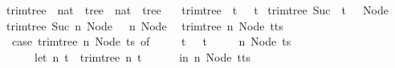 \begin{isabellebox}
    \isamarkupfalse%
\ trim{\isacharunderscore}{\kern0pt}tree\ {\isacharcolon}{\kern0pt}{\isacharcolon}{\kern0pt}\ {\isachardoublequoteopen}nat\ {\isasymRightarrow}\ tree\ {\isasymRightarrow}\ nat\ {\isasymtimes}\ tree{\isachardoublequoteclose}\ \isanewline
\ \ {\isachardoublequoteopen}trim{\isacharunderscore}{\kern0pt}tree\ {}\ t\ {\isacharequal}{\kern0pt}\ {\isacharparenleft}{\kern0pt}{}{\isacharcomma}{\kern0pt}\ t{\isacharparenright}{\kern0pt}{\isachardoublequoteclose}\isanewline
{\isacharbar}{\kern0pt}\ {\isachardoublequoteopen}trim{\isacharunderscore}{\kern0pt}tree\ {\isacharparenleft}{\kern0pt}Suc\ {}{\isacharparenright}{\kern0pt}\ t\ {\isacharequal}{\kern0pt}\ {\isacharparenleft}{\kern0pt}{}{\isacharcomma}{\kern0pt}\ Node\ {\isacharbrackleft}{\kern0pt}{\isacharbrackright}{\kern0pt}{\isacharparenright}{\kern0pt}{\isachardoublequoteclose}\isanewline
{\isacharbar}{\kern0pt}\ {\isachardoublequoteopen}trim{\isacharunderscore}{\kern0pt}tree\ {\isacharparenleft}{\kern0pt}Suc\ n{\isacharparenright}{\kern0pt}\ {\isacharparenleft}{\kern0pt}Node\ {\isacharbrackleft}{\kern0pt}{\isacharbrackright}{\kern0pt}{\isacharparenright}{\kern0pt}\ {\isacharequal}{\kern0pt}\ {\isacharparenleft}{\kern0pt}n{\isacharcomma}{\kern0pt}\ Node\ {\isacharbrackleft}{\kern0pt}{\isacharbrackright}{\kern0pt}{\isacharparenright}{\kern0pt}{\isachardoublequoteclose}\isanewline
{\isacharbar}{\kern0pt}\ {\isachardoublequoteopen}trim{\isacharunderscore}{\kern0pt}tree\ n\ {\isacharparenleft}{\kern0pt}Node\ {\isacharparenleft}{\kern0pt}t{\isacharhash}{\kern0pt}ts{\isacharparenright}{\kern0pt}{\isacharparenright}{\kern0pt}\ {\isacharequal}{\kern0pt}\isanewline
\ \ {\isacharparenleft}{\kern0pt}case\ trim{\isacharunderscore}{\kern0pt}tree\ n\ {\isacharparenleft}{\kern0pt}Node\ ts{\isacharparenright}{\kern0pt}\ of\isanewline
\ \ \ \ {\isacharparenleft}{\kern0pt}{}{\isacharcomma}{\kern0pt}\ t{\isacharprime}{\kern0pt}{\isacharparenright}{\kern0pt}\ {\isasymRightarrow}\ {\isacharparenleft}{\kern0pt}{}{\isacharcomma}{\kern0pt}\ t{\isacharprime}{\kern0pt}{\isacharparenright}{\kern0pt}\ {\isacharbar}{\kern0pt}\isanewline
\ \ \ \ {\isacharparenleft}{\kern0pt}n{}{\isacharcomma}{\kern0pt}\ Node\ ts{\isacharprime}{\kern0pt}{\isacharparenright}{\kern0pt}\ {\isasymRightarrow}\isanewline
\ \ \ \ \ \ let\ {\isacharparenleft}{\kern0pt}n{}{\isacharcomma}{\kern0pt}\ t{\isacharprime}{\kern0pt}{\isacharparenright}{\kern0pt}\ {\isacharequal}{\kern0pt}\ trim{\isacharunderscore}{\kern0pt}tree\ n{}\ t\isanewline
\ \ \ \ \ \ in\ {\isacharparenleft}{\kern0pt}n{}{\isacharcomma}{\kern0pt}\ Node\ {\isacharparenleft}{\kern0pt}t{\isacharprime}{\kern0pt}{\isacharhash}{\kern0pt}ts{\isacharprime}{\kern0pt}{\isacharparenright}{\kern0pt}{\isacharparenright}{\kern0pt}{\isacharparenright}{\kern0pt}{\isachardoublequoteclose}
\end{isabellebox}

